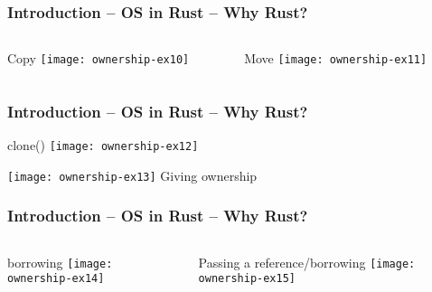 \begin{frame}[plain]
	\frametitle{Introduction -- OS in Rust -- Why Rust?}
	
	
	
	\begin{columns}
		
		\begin{column}{.5\textwidth}
			\centering
			\Large
			Copy
			\texttt{[image: ownership-ex10]}
			
		\end{column}
		
		\begin{column}{.5\textwidth}
			
			\Large
			
			
			Move
			\texttt{[image: ownership-ex11]}
			
		\end{column}
		
		
	\end{columns}
	
	
\end{frame}

\begin{frame}[plain]	
	\frametitle{Introduction -- OS in Rust -- Why Rust?}
	\centering
	\Large
	clone()
	\texttt{[image: ownership-ex12]}
	
	\texttt{[image: ownership-ex13]}
	Giving ownership
\end{frame}



\begin{frame}[plain]
	\frametitle{Introduction -- OS in Rust -- Why Rust?}
	
	
	
	\begin{columns}
		
		\begin{column}{.3\textwidth}
			\centering
			\Large
			borrowing
			\texttt{[image: ownership-ex14]}
			
		\end{column}
		
		\begin{column}{.7\textwidth}
			
			\Large
			
			
			Passing a reference/borrowing
			\texttt{[image: ownership-ex15]}
			
		\end{column}
		
		
	\end{columns}
	
	
\end{frame}


